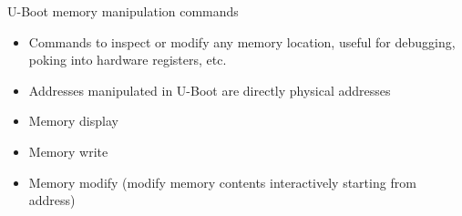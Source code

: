 \begin{frame}{U-Boot memory manipulation commands}
  \begin{itemize}
  \item Commands to inspect or modify any memory location, useful for
    debugging, poking into hardware registers, etc.
  \item Addresses manipulated in U-Boot are directly physical
    addresses
  \item Memory display\\
  \item Memory write\\
  \item Memory modify (modify memory contents interactively starting from address)\\
  \end{itemize}
\end{frame}

